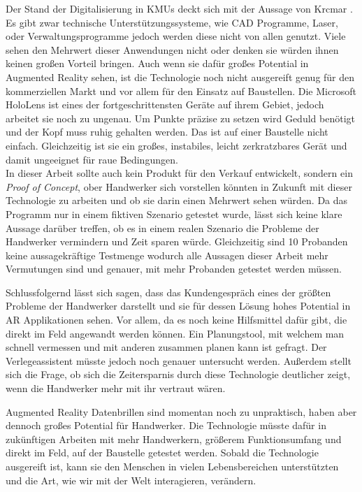 Der Stand der Digitalisierung in KMUs deckt sich mit der Aussage von Krcmar \cite{hateful_six_krcmar}. Es gibt zwar technische Unterstützungssysteme, wie CAD Programme, Laser, oder Verwaltungsprogramme jedoch werden diese nicht von allen genutzt. Viele sehen den Mehrwert dieser Anwendungen nicht oder denken sie würden ihnen keinen großen Vorteil bringen. Auch wenn sie dafür großes Potential in Augmented Reality sehen, ist die Technologie noch nicht ausgereift genug für den kommerziellen Markt und vor allem für den Einsatz auf Baustellen. Die Microsoft HoloLens ist eines der fortgeschrittensten Geräte auf ihrem Gebiet, jedoch arbeitet sie noch zu ungenau. Um Punkte präzise zu setzen wird Geduld benötigt und der Kopf muss ruhig gehalten werden. Das ist auf einer Baustelle nicht einfach. Gleichzeitig ist sie ein großes, instabiles, leicht zerkratzbares Gerät und damit ungeeignet für raue Bedingungen. \\
In dieser Arbeit sollte auch kein Produkt für den Verkauf entwickelt, sondern ein \textit{Proof of Concept}, ober Handwerker sich vorstellen könnten in Zukunft mit dieser Technologie zu arbeiten und ob sie darin einen Mehrwert sehen würden. Da das Programm nur in einem fiktiven Szenario getestet wurde, lässt sich keine klare Aussage darüber treffen, ob es in einem realen Szenario die Probleme der Handwerker vermindern und Zeit sparen würde. Gleichzeitig sind 10 Probanden keine aussagekräftige Testmenge wodurch alle Aussagen dieser Arbeit mehr Vermutungen sind und genauer, mit mehr Probanden getestet werden müssen.

Schlussfolgernd lässt sich sagen, dass das Kundengespräch eines der größten Probleme der Handwerker darstellt und sie für dessen Lösung hohes Potential in AR Applikationen sehen. Vor allem, da es noch keine Hilfsmittel dafür gibt, die direkt im Feld angewandt werden können. Ein Planungstool, mit welchem man schnell vermessen und mit anderen zusammen planen kann ist gefragt. Der Verlegeassistent müsste jedoch noch genauer untersucht werden. Außerdem stellt sich die Frage, ob sich die Zeitersparnis durch diese Technologie deutlicher zeigt, wenn die Handwerker mehr mit ihr vertraut wären. 

Augmented Reality Datenbrillen sind momentan noch zu unpraktisch, haben aber dennoch großes Potential für Handwerker. Die Technologie müsste dafür in zukünftigen Arbeiten mit mehr Handwerkern, größerem Funktionsumfang und direkt im Feld, auf der Baustelle getestet werden. Sobald die Technologie ausgereift ist, kann sie den Menschen in vielen Lebensbereichen unterstützten und die Art, wie wir mit der Welt interagieren, verändern.
